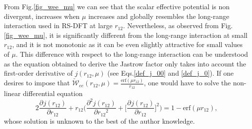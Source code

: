\documentclass[aip,jcp,reprint,noshowkeys,superscriptaddress]{revtex4-1}
\newcommand{\deriv}[3]{\frac{\partial^{#3} #1}{\partial {#2}^{#3}}}
\begin{document}
From  Fig.\ref{fig_wee_mu} we can see that the scalar effective potential 
is non divergent, increases when $\mu$ increases and globally resembles the long-range interaction used in RS-DFT at large $r_{12}$. 
Nevertheless, as observed from Fig.\ref{fig_wee_mu}, it is significantly different 
from the long-range interaction at small $r_{12}$, 
and it is not monotonic as it can be even slightly attractive for small values of $\mu$. 
This difference with respect to the long-range interaction can be understood as the equation obtained to derive the Jastrow factor only takes into account the first-order derivative of $j(r_{12},\mu)$ (see Eqs.\eqref{def_j_00} and \eqref{def_j_0}). 
If one desires to impose that $\tilde{\mathcal{W}}_{ee}(r_{12},\mu) = \frac{\text{erf}(\mu r_{12})}{r_{12}}$, one would have to solve the non-linear differential equation 
\begin{equation}
 2 \deriv{j(r_{12})}{r_{12}}{} + r_{12} \bigg( \deriv{j(r_{12})}{r_{12}}{2} + \bigg[ \deriv{j(r_{12})}{r_{12}}{} \bigg]^2\bigg) = 1 - \text{erf}(\mu r_{12}), 
\end{equation}
whose solution is unknown to the best of the author knowledge. 
\end{document}
